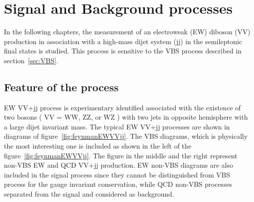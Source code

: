 \chapter{Signal and Background processes}
\label{chap:sigbkg}
In the following chapters, the measurement of an electroweak (EW) diboson (VV) production in association with a high-mass dijet system (jj) in the semileptonic final states is studied.
This process is sensitive to the VBS process described in section~\ref{sec:VBS}.
\section{Feature of the process}
EW VV+jj process is experimentary identified associated with the existence of two bosons ( VV = WW, ZZ, or WZ ) with two jets in opposite hemisphere with a large dijet invariant mass.
The typical EW VV+jj processes are shown in diagrams of figure~\ref{fig:feynmanEWVVjj}.
The VBS diagrams, which is physically the most interesting one is included as shown in the left of the figure~\ref{fig:feynmanEWVVjj}. The figure in the middle and the right represent non-VBS EW and QCD VV+jj production. EW non-VBS diagrams are also included in the signal process since they cannot be distinguished from VBS process for the gauge invariant conservation, while QCD non-VBS processes separated from the signal and considered as background.

